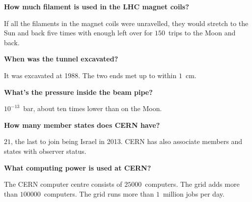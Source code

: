 \documentclass{atlasnote}
\newenvironment{question} %
{\noindent\bfseries}
{\par}
\newenvironment{answer} %
{}
{\vspace*{10pt}}
\newenvironment{faq} %
{\par\noindent\begin{minipage}{\linewidth}}
    {\end{minipage}\par}
\begin{document}
\begin{faq}
    \begin{question}
        How much filament is used in the LHC magnet coils?
    \end{question}
    \begin{answer}
        If all the filaments in the magnet coils were unravelled, they would stretch to the Sun and back five times with enough left over for $150$~trips to the
        Moon and back.
    \end{answer}
\end{faq}

\begin{faq}
    \begin{question}
        When was the tunnel excavated?
    \end{question}
    \begin{answer}
        It was excavated at 1988. The two ends met up to within $1$~cm.
    \end{answer}
\end{faq}

\begin{faq}
    \begin{question}
        What's the pressure inside the beam pipe?
    \end{question}
    \begin{answer}
        $10^{-13}$~bar, about ten times lower than on the Moon.
    \end{answer}
\end{faq}

\begin{faq}
    \begin{question}
        How many member states does CERN have?
    \end{question}
    \begin{answer}
        $21$, the last to join being Israel in 2013. CERN has also associate members and states with observer status.
    \end{answer}
\end{faq}

\begin{faq}
    \begin{question}
        What computing power is used at CERN?
    \end{question}
    \begin{answer}
        The CERN computer centre consists of $25000$~computers. The grid adds more than $100000$~computers. The grid runs more than $1$~million jobs per day.
    \end{answer}
\end{faq}
\end{document}
